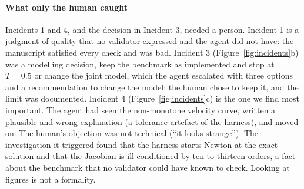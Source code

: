 \paragraph{What only the human caught}
Incidents 1 and 4, and the decision in Incident 3, needed a person. Incident 1 is a judgment of
quality that no validator expressed and the agent did not have: the manuscript satisfied every check
and was bad. Incident 3 (Figure~\ref{fig:incidents}b) was a modelling decision, keep the benchmark
as implemented and stop at $T=0.5$ or change the joint model, which the agent escalated with three
options and a recommendation to change the model; the human chose to keep it, and the limit was
documented. Incident 4 (Figure~\ref{fig:incidents}c) is the one we find most important. The agent
had seen the non-monotone velocity curve, written a plausible and wrong explanation (a tolerance
artefact of the harness), and moved on. The human's objection was not technical (``it looks
strange''). The investigation it triggered found that the harness starts Newton at the exact
solution and that the Jacobian is ill-conditioned by ten to thirteen orders, a fact about the
benchmark that no validator could have known to check. Looking at figures is not a formality.
